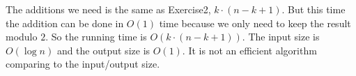 The additions we need is the same as Exercise2, $k\cdot (n-k+1)$.
But this time the addition can be done in $O(1)$ time because we only need to keep the result modulo $2$.
So the running time is $O(k\cdot (n-k+1))$.
The input size is $O(\log n)$ and the output size is $O(1)$. It is not an efficient algorithm comparing to the input/output size.
